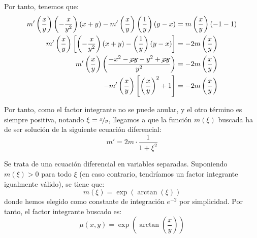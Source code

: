 \documentclass[12pt]{article}
\begin{document}
\begin{ejercicio}
\begin{enumerate}
        Por tanto, tenemos que:
        \begin{align*}
            m'\left(\frac{x}{y}\right)\left(-\frac{x}{y^2}\right)(x+y)-m'\left(\frac{x}{y}\right)\left(\frac{1}{y}\right)(y-x)&=m\left(\frac{x}{y}\right)(-1-1)\\
            m'\left(\frac{x}{y}\right)\left[\left(-\frac{x}{y^2}\right)(x+y)-\left(\frac{1}{y}\right)(y-x)\right]&=-2m\left(\frac{x}{y}\right)\\
            m'\left(\frac{x}{y}\right)\left(\frac{-x^2-\cancel{xy}-y^2+\cancel{xy}}{y^2}\right)&=-2m\left(\frac{x}{y}\right)\\
            -m'\left(\frac{x}{y}\right)\left[\left(\frac{x}{y}\right)^2+1\right]&=-2m\left(\frac{x}{y}\right)
        \end{align*}

        Por tanto, como el factor integrante no se puede anular, y el otro término es siempre positiva, notando $\xi=\nicefrac{x}{y}$, llegamos a que la función $m(\xi)$ buscada ha de ser solución de la siguiente ecuación diferencial:
        \begin{equation*}
            m'=2m\cdot \frac{1}{1+\xi^2}
        \end{equation*}

        Se trata de una ecuación diferencial en variables separadas. Suponiendo $m(\xi)>0$ para todo $\xi$ (en caso contrario, tendríamos un factor integrante igualmente válido), se tiene que:
        \begin{equation*}
            m(\xi)=\exp(\arctan(\xi))
        \end{equation*}
        donde hemos elegido como constante de integración $e^{-2}$ por simplicidad. Por tanto, el factor integrante buscado es:
        \begin{equation*}
            \mu(x,y)=\exp\left(\arctan\left(\frac{x}{y}\right)\right)
        \end{equation*}
    \end{enumerate}
\end{ejercicio}
\end{document}
